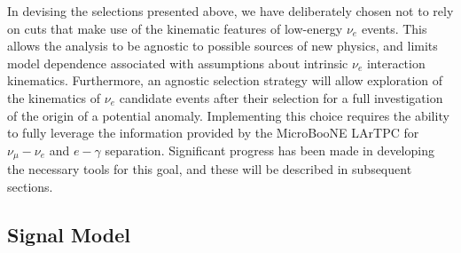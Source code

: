 \par %
In devising the selections presented above, we have deliberately chosen not to rely on cuts that make use of the kinematic features of low-energy $\nu_e$ events. This allows the analysis to be agnostic to possible sources of new physics, and limits model dependence associated with assumptions about intrinsic $\nu_e$ interaction kinematics. Furthermore, an agnostic selection strategy will allow exploration of the kinematics of $\nu_e$ candidate events after their selection for a full investigation of the origin of a potential anomaly. Implementing this choice requires the ability to fully leverage the information provided by the MicroBooNE LArTPC for $\nu_{\mu}-\nu_e$ and $e-\gamma$ separation. Significant progress has been made in developing the necessary tools for this goal, and these will be described in subsequent sections. 




\subsection{Signal Model}
\label{sec:introduction:LEE}

